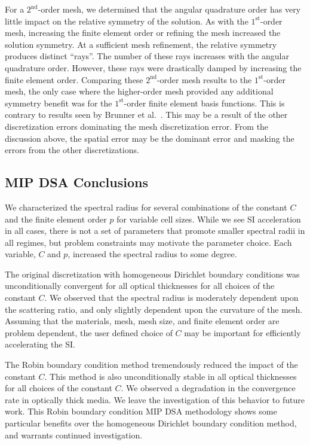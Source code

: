 \documentclass[12pt]{article}
\begin{document}
For a $2^\text{nd}$-order mesh, we determined that the angular quadrature order has very little impact on the relative symmetry of the solution. As with the $1^\text{st}$-order mesh, increasing the finite element order or refining the mesh increased the solution symmetry. At a sufficient mesh refinement, the relative symmetry produces distinct ``rays''. The number of these rays increases with the angular quadrature order. However, these rays were drastically damped by increasing the finite element order. Comparing these $2^\text{nd}$-order mesh results to the $1^\text{st}$-order mesh, the only case where the higher-order mesh provided any additional symmetry benefit was for the $1^\text{st}$-order finite element basis functions. This is contrary to results seen by Brunner et al.~\cite{BrunnerSphericalsymmetry}. This may be a result of the other discretization errors dominating the mesh discretization error. From the discussion above, the spatial error may be the dominant error and masking the errors from the other discretizations.

\subsection{MIP DSA Conclusions}
\label{sec:MIPDSAConclusions}
We characterized the spectral radius for several combinations of the constant $C$ and the finite element order $p$ for variable cell sizes. While we see SI acceleration in all cases, there is not a set of parameters that promote smaller spectral radii in all regimes, but problem constraints may motivate the parameter choice. Each variable, $C$ and $p$, increased the spectral radius to some degree.

The original discretization with homogeneous Dirichlet boundary conditions was unconditionally convergent for all optical thicknesses for all choices of the constant $C$. We observed that the spectral radius is moderately dependent upon the scattering ratio, and only slightly dependent upon the curvature of the mesh. Assuming that the materials, mesh, mesh size, and finite element order are problem dependent, the user defined choice of $C$ may be important for efficiently accelerating the SI.

The Robin boundary condition method tremendously reduced the impact of the constant $C$. This method is also unconditionally stable in all optical thicknesses for all choices of the constant $C$. We observed a degradation in the convergence rate in optically thick media. We leave the investigation of this behavior to future work. This Robin boundary condition MIP DSA methodology shows some particular benefits over the homogeneous Dirichlet boundary condition method, and warrants continued investigation.
\end{document}
